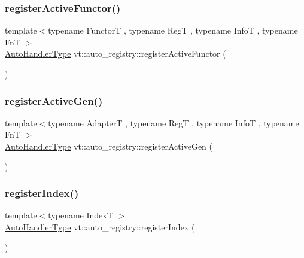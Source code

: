 \subsubsection{\texorpdfstring{register\+Active\+Functor()}{registerActiveFunctor()}}
{\footnotesize\ttfamily template$<$typename FunctorT , typename RegT , typename InfoT , typename FnT $>$ \\
\hyperlink{namespacevt_1_1auto__registry_ae295e18699146815bb7d7674594d95d7}{Auto\+Handler\+Type} vt\+::auto\+\_\+registry\+::register\+Active\+Functor (\begin{DoxyParamCaption}{ }\end{DoxyParamCaption})}

\mbox{\label{namespacevt_1_1auto__registry_aa16ec3feb8483e91ba4775b634ba0c65}} 
\subsubsection{\texorpdfstring{register\+Active\+Gen()}{registerActiveGen()}}
{\footnotesize\ttfamily template$<$typename AdapterT , typename RegT , typename InfoT , typename FnT $>$ \\
\hyperlink{namespacevt_1_1auto__registry_ae295e18699146815bb7d7674594d95d7}{Auto\+Handler\+Type} vt\+::auto\+\_\+registry\+::register\+Active\+Gen (\begin{DoxyParamCaption}{ }\end{DoxyParamCaption})}

\mbox{\label{namespacevt_1_1auto__registry_a234dcadb35d20ff9a4d0e2464680aa36}} 
\subsubsection{\texorpdfstring{register\+Index()}{registerIndex()}}
{\footnotesize\ttfamily template$<$typename IndexT $>$ \\
\hyperlink{namespacevt_1_1auto__registry_ae295e18699146815bb7d7674594d95d7}{Auto\+Handler\+Type} vt\+::auto\+\_\+registry\+::register\+Index (\begin{DoxyParamCaption}{ }\end{DoxyParamCaption})}

